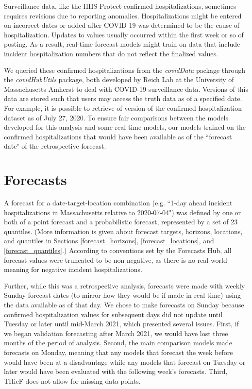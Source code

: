 \documentclass[thesis]{umassthesis}  %
\begin{document}
Surveillance data, like the HHS Protect confirmed hospitalizations, sometimes requires revisions due to reporting anomalies. Hospitalizations might be entered on incorrect dates or added after COVID-19 was determined to be the cause of hospitalization. Updates to values usually occurred within the first week or so of posting. As a result, real-time forecast models might train on data that include incident hospitalization numbers that do not reflect the finalized values.

We queried these confirmed hospitalizations from the \textit{covidData} package through the \textit{covidHubUtils} package, both developed by Reich Lab at the University of Massachusetts Amherst to deal with COVID-19 surveillance data. Versions of this data are stored such that users may access the truth data as of a specified date\cite{hub_data_research}. For example, it is possible to retrieve of version of the confirmed hospitalization dataset as of July 27, 2020. To ensure fair comparisons between the models developed for this analysis and some real-time models, our models trained on the confirmed hospitalizations that would have been available as of the ``forecast date" of the retrospective forecast.

\section{Forecasts} \label{forecasts}
A forecast for a date-target-location combination (e.g. ``1-day ahead incident hospitalizations in Massachusetts relative to 2020-07-04") was defined by one or both of a point forecast and a probabilistic forecast, represented by a set of 23 quantiles\cite{cramer}. (More information is given about forecast targets, horizons, locations, and quantiles in Sections \ref{forecast_horizons}, \ref{forecast_locations}, and \ref{forecast_quantiles}.) According to conventions set by the Forecasts Hub, all forecast values were truncated to be non-negative, as there is no real-world meaning for negative incident hospitalizations\cite{ensembles_info}.

Further, while this was a retrospective analysis, forecasts were made with weekly Sunday forecast dates (to mirror how they would be if made in real-time) using the data available as of that day. We chose to make forecasts on Sunday because confirmed hospitalization values for subsequent days did not update until Tuesday or later until mid-March 2021, which presented several issues. First, if we began validation forecasting after March 2021, we would have lost three months of the period of analysis. Second, the main comparison models made forecasts on Monday, meaning that any models that forecast the week before would have been at a disadvantage while any models that forecast on Tuesday or later would have been evaluated with the following week's forecasts. Third, THieF does not allow for missing data points.
\end{document}
